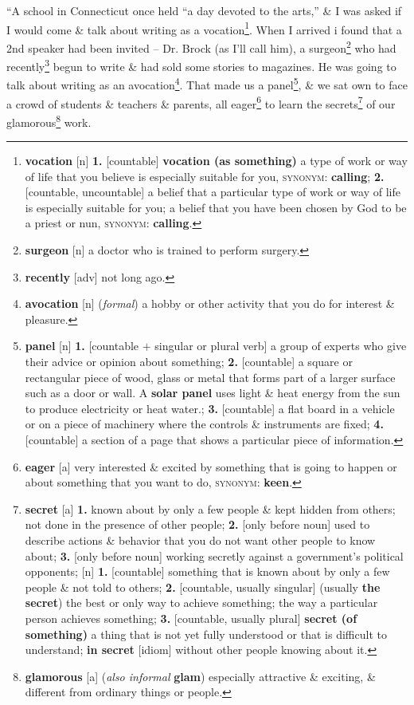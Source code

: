 \documentclass[oneside]{book}
\numberwithin{equation}{section}
\begin{document}
``A school in Connecticut once held ``a day devoted to the arts,'' \& I was asked if I would come \& talk about writing as a vocation\footnote{\textbf{vocation} [n] \textbf{1.} [countable] \textbf{vocation (as something)} a type of work or way of life that you believe is especially suitable for you, \textsc{synonym}: \textbf{calling}; \textbf{2.} [countable, uncountable] a belief that a particular type of work or way of life is especially suitable for you; a belief that you have been chosen by God to be a priest or nun, \textsc{synonym}: \textbf{calling}.}. When I arrived i found that a 2nd speaker had been invited -- Dr. Brock (as I'll call him), a surgeon\footnote{\textbf{surgeon} [n] a doctor who is trained to perform surgery.} who had recently\footnote{\textbf{recently} [adv] not long ago.} begun to write \& had sold some stories to magazines. He was going to talk about writing as an avocation\footnote{\textbf{avocation} [n] (\textit{formal}) a hobby or other activity that you do for interest \& pleasure.}. That made us a panel\footnote{\textbf{panel} [n] \textbf{1.} [countable $+$ singular or plural verb] a group of experts who give their advice or opinion about something; \textbf{2.} [countable] a square or rectangular piece of wood, glass or metal that forms part of a larger surface such as a door or wall. A \textbf{solar panel} uses light \& heat energy from the sun to produce electricity or heat water.; \textbf{3.} [countable] a flat board in a vehicle or on a piece of machinery where the controls \& instruments are fixed; \textbf{4.} [countable] a section of a page that shows a particular piece of information.}, \& we sat own to face a crowd of students \& teachers \& parents, all eager\footnote{\textbf{eager} [a] very interested \& excited by something that is going to happen or about something that you want to do, \textsc{synonym}: \textbf{keen}.} to learn the secrets\footnote{\textbf{secret} [a] \textbf{1.} known about by only a few people \& kept hidden from others; not done in the presence of other people; \textbf{2.} [only before noun] used to describe actions \& behavior that you do not want other people to know about; \textbf{3.} [only before noun] working secretly against a government's political opponents; [n] \textbf{1.} [countable] something that is known about by only a few people \& not told to others; \textbf{2.} [countable, usually singular] (usually \textbf{the secret}) the best or only way to achieve something; the way a particular person achieves something; \textbf{3.} [countable, usually plural] \textbf{secret (of something)} a thing that is not yet fully understood or that is difficult to understand; \textbf{in secret} [idiom] without other people knowing about it.} of our glamorous\footnote{\textbf{glamorous} [a] (\textit{also informal} \textbf{glam}) especially attractive \& exciting, \& different from ordinary things or people.} work.
\end{document}
